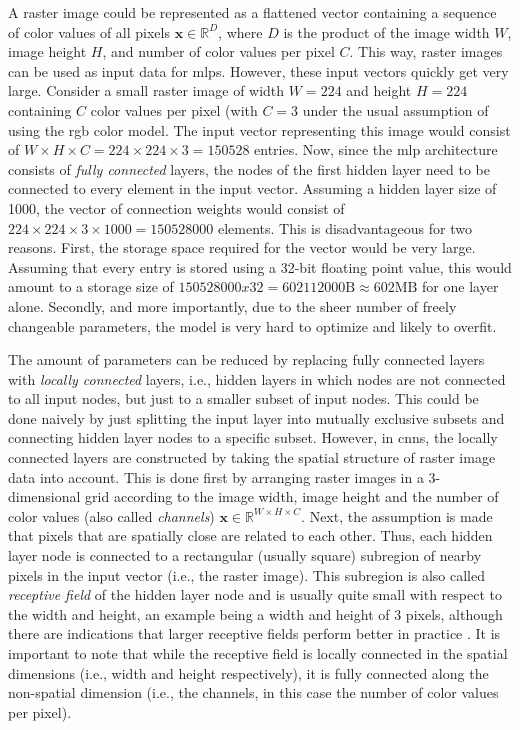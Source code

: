 A raster image could be represented as a flattened vector containing a sequence of color values of all pixels $\textbf{x}\in\mathbb{R}^{D}$, where $D$ is the product of the image width $W$, image height $H$, and number of color values per pixel $C$. This way, raster images can be used as input data for \glspl{mlp}. However, these input vectors quickly get very large. Consider a small raster image of width $W=224$ and height $H=224$ containing $C$ color values per pixel (with $C=3$ under the usual assumption of using the \gls{rgb} color model. The input vector representing this image would consist of $W\times H\times C=224\times224\times3=150528$ entries. Now, since the \gls{mlp} architecture consists of \emph{fully connected} layers, the nodes of the first hidden layer need to be connected to every element in the input vector. Assuming a hidden layer size of 1000, the vector of connection weights would consist of $224\times224\times3\times1000=150528000$ elements. This is disadvantageous for two reasons. First, the storage space required for the vector would be very large. Assuming that every entry is stored using a 32-bit floating point value, this would amount to a storage size of $150528000x32=602112000 \text{B} \approx 602 \text{MB}$ for one layer alone. Secondly, and more importantly, due to the sheer number of freely changeable parameters, the model is very hard to optimize and likely to overfit. 

The amount of parameters can be reduced by replacing fully connected layers with \emph{locally connected} layers, i.e., hidden layers in which nodes are not connected to all input nodes, but just to a smaller subset of input nodes. This could be done naively by just splitting the input layer into mutually exclusive subsets and connecting hidden layer nodes to a specific subset. However, in \glspl{cnn}, the locally connected layers are constructed by taking the spatial structure of raster image data into account. This is done first by arranging raster images in a 3-dimensional grid according to the image width, image height and the number of color values (also called \emph{channels}) $\textbf{x}\in\mathbb{R}^{W\times H \times C}$. Next, the assumption is made that pixels that are spatially close are related to each other. Thus, each hidden layer node is connected to a rectangular (usually square) subregion of nearby pixels in the input vector (i.e., the raster image). This subregion is also called \emph{receptive field} of the hidden layer node and is usually quite small with respect to the width and height, an example being a width and height of 3 pixels, although there are indications that larger receptive fields perform better in practice \citep{liu2021Swin,DBLP:conf/cvpr/0003MWFDX22}. It is important to note that while the receptive field is locally connected in the spatial dimensions (i.e., width and height respectively), it is fully connected along the non-spatial dimension (i.e., the channels, in this case the number of color values per pixel).

